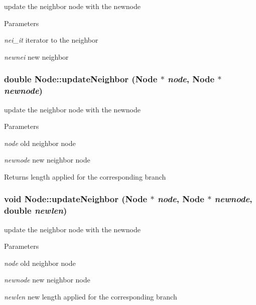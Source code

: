 \label{classNode_ab45fa6addf881a2c6c090bbd9686710f}
update the neighbor node with the newnode 
\begin{DoxyParams}{Parameters}
\item[{\em nei\_\-it}]iterator to the neighbor \item[{\em newnei}]new neighbor \end{DoxyParams}
\hypertarget{classNode_ac0dce50c1942b6c015fb8a10695dcc5a}{
\subsubsection[{updateNeighbor}]{\setlength{\rightskip}{0pt plus 5cm}double Node::updateNeighbor ({\bf Node} $\ast$ {\em node}, \/  {\bf Node} $\ast$ {\em newnode})}}
\label{classNode_ac0dce50c1942b6c015fb8a10695dcc5a}
update the neighbor node with the newnode 
\begin{DoxyParams}{Parameters}
\item[{\em node}]old neighbor node \item[{\em newnode}]new neighbor node \end{DoxyParams}
\begin{DoxyReturn}{Returns}
length applied for the corresponding branch 
\end{DoxyReturn}
\hypertarget{classNode_a991931db235cedbcdae20bcb77a57671}{
\subsubsection[{updateNeighbor}]{\setlength{\rightskip}{0pt plus 5cm}void Node::updateNeighbor ({\bf Node} $\ast$ {\em node}, \/  {\bf Node} $\ast$ {\em newnode}, \/  double {\em newlen})}}
\label{classNode_a991931db235cedbcdae20bcb77a57671}
update the neighbor node with the newnode 
\begin{DoxyParams}{Parameters}
\item[{\em node}]old neighbor node \item[{\em newnode}]new neighbor node \item[{\em newlen}]new length applied for the corresponding branch \end{DoxyParams}


